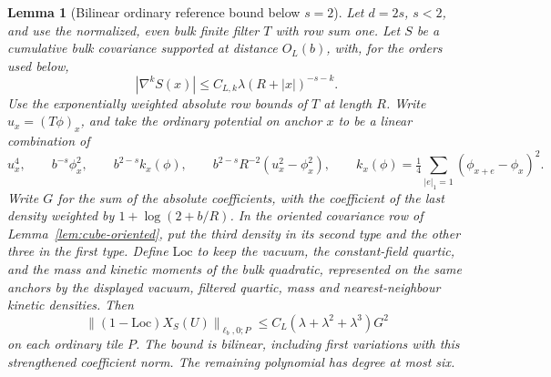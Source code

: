 \documentclass[11pt]{article}
\newtheorem{lemma}[theorem]{Lemma}
\theoremstyle{definition}
\begin{document}
\begin{lemma}[Bilinear ordinary reference bound below \(s=2\)]
\label{lem:cube-ordinary-W}
Let \(d=2s\), \(s<2\), and use the normalized, even bulk finite
filter \(T\) with row sum one. Let \(S\) be a cumulative bulk
covariance supported at distance \(O_L(b)\), with, for the orders
used below,
\begin{equation}
 |\nabla^k S(x)|\le C_{L,k}\lambda(R+|x|)^{-s-k}.
\end{equation}
Use the exponentially weighted absolute row bounds of \(T\)
at length \(R\). Write \(u_x=(T\phi)_x\), and take the ordinary
potential on anchor \(x\) to be a linear combination of
\begin{equation}
 u_x^4,\qquad b^{-s}\phi_x^2,\qquad
 b^{2-s} k_x(\phi),\qquad b^{2-s}R^{-2}(u_x^2-\phi_x^2),
 \qquad
 k_x(\phi)=\tfrac14\sum_{|e|_1=1}(\phi_{x+e}-\phi_x)^2 .
\end{equation}
Write \(G\) for the sum of the absolute coefficients, with the
coefficient of the last density weighted by
\(1+\log(2+b/R)\). In the oriented covariance row of
Lemma~\ref{lem:cube-oriented}, put the third density in its
second type and the other three in the first type. Define
\(\mathrm{Loc}\) to keep the vacuum, the constant-field
quartic, and the mass and kinetic moments of the bulk
quadratic, represented on the same anchors by the displayed
vacuum, filtered quartic, mass and nearest-neighbour kinetic
densities. Then
\begin{equation}
 \bigl\|(1-\mathrm{Loc})X_{S}(U)\bigr\|_{\ell_b,0;P}
       \le C_L(\lambda+\lambda^2+\lambda^3)G^2
\end{equation}
on each ordinary tile \(P\). The bound is bilinear, including
first variations with this strengthened coefficient norm.
The remaining polynomial has degree at most six.
\end{lemma}
\end{document}
